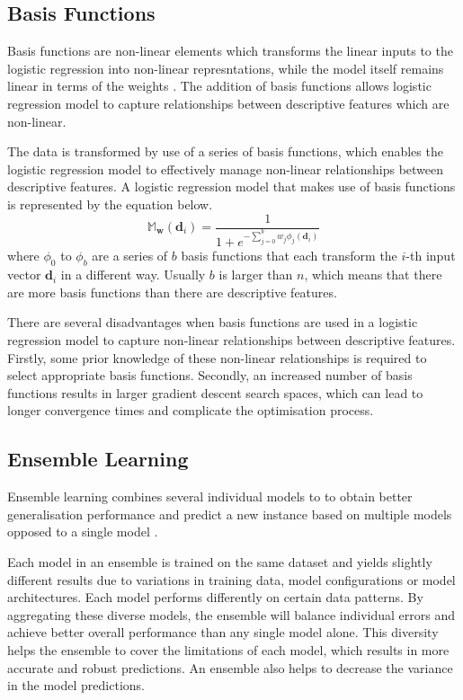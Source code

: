 \documentclass[10pt, conference]{IEEEtran}
\begin{document}
\subsection{Basis Functions}

Basis functions are non-linear elements which transforms the linear inputs to the logistic regression
into non-linear represntations, while the model itself remains linear in terms of the weights \cite{basis_fun_ref}.
The addition of basis functions allows logistic regression model to capture relationships between descriptive
features which are non-linear.

The data is transformed by use of a series of basis functions, which enables the logistic regression model to effectively
manage non-linear relationships between descriptive features. A logistic regression model that makes use of
basis functions is represented by the equation below.
\begin{equation}
    \mathbb{M}_{\textbf{w}}(\textbf{d}_i) = \frac{1}{1 + e^{-\sum_{j=0}^{b}w_j \phi_j(\textbf{d}_i)}} \label{eq: non_logistic_regression_equation}
\end{equation}
where $\phi_0$ to $\phi_b$ are a series of $b$ basis functions that each transform the $i$-th input vector $\textbf{d}_i$ in a different way.
Usually $b$ is larger than $n$, which means that there are more basis functions than there are descriptive features.

There are several disadvantages when basis functions are used in a logistic regression model to capture non-linear relationships
between descriptive features. Firstly, some prior knowledge of these non-linear relationships is required to select appropriate
basis functions. Secondly, an increased number of basis functions results in larger gradient descent search spaces, which can lead to
longer convergence times and complicate the optimisation process.

\subsection{Ensemble Learning}

Ensemble learning combines several individual models to to obtain better generalisation performance and predict a new instance
based on multiple models opposed to a single model \cite{Ensemble_ref}.

Each model in an ensemble is trained on the same dataset and yields slightly different results due to variations
in training data, model configurations or model architectures. Each model performs differently on certain data
patterns. By aggregating these diverse models, the ensemble will balance individual errors and
achieve better overall performance than any single model alone. This diversity helps the ensemble to cover the
limitations of each model, which results in more accurate and robust predictions. An ensemble also helps to
decrease the variance in the model predictions.
\end{document}
